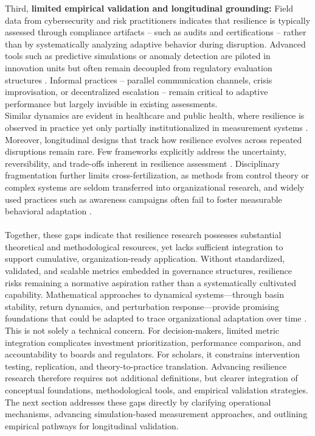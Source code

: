 Third, {\bf limited empirical validation and longitudinal grounding:} Field data from cybersecurity and risk practitioners indicates that resilience is typically assessed through compliance artifacts -- such as audits and certifications -- rather than by systematically analyzing adaptive behavior during disruption. Advanced tools such as predictive simulations or anomaly detection are piloted in innovation units but often remain decoupled from regulatory evaluation structures \autocite{skopik2016problem}. Informal practices -- parallel communication channels, crisis improvisation, or decentralized escalation -- remain critical to adaptive performance but largely invisible in existing assessments.\\

Similar dynamics are evident in healthcare and public health, where resilience is observed in practice yet only partially institutionalized in measurement systems \autocite{kruk2017building}. Moreover, longitudinal designs that track how resilience evolves across repeated disruptions remain rare. Few frameworks explicitly address the uncertainty, reversibility, and trade-offs inherent in resilience assessment \autocite{allen2018quantifying}. Disciplinary fragmentation further limits cross-fertilization, as methods from control theory or complex systems are seldom transferred into organizational research, and widely used practices such as awareness campaigns often fail to foster measurable behavioral adaptation \autocite{bada2019cyber}.\\
\\
Together, these gaps indicate that resilience research possesses substantial theoretical and methodological resources, yet lacks sufficient integration to support cumulative, organization-ready application. Without standardized, validated, and scalable metrics embedded in governance structures, resilience risks remaining a normative aspiration rather than a systematically cultivated capability. Mathematical approaches to dynamical systems—through basin stability, return dynamics, and perturbation response—provide promising foundations that could be adapted to trace organizational adaptation over time \autocite{krakovska2024resilience}. This is not solely a technical concern. For decision-makers, limited metric integration complicates investment prioritization, performance comparison, and accountability to boards and regulators. For scholars, it constrains intervention testing, replication, and theory-to-practice translation. Advancing resilience research therefore requires not additional definitions, but clearer integration of conceptual foundations, methodological tools, and empirical validation strategies. The next section addresses these gaps directly by clarifying operational mechanisms, advancing simulation-based measurement approaches, and outlining empirical pathways for longitudinal validation.

